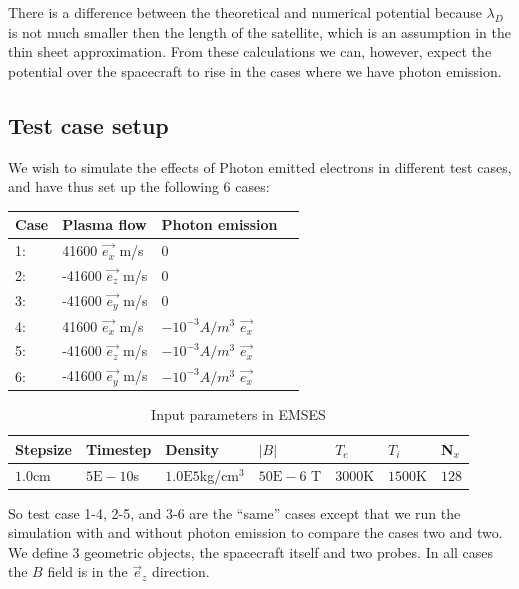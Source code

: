 There is a difference between the theoretical and numerical potential because $\lambda_D$ is not much
smaller then the length of the satellite, which is an assumption in the thin sheet approximation.
From these calculations we can, however, expect the potential over the spacecraft to rise
in the cases where we have photon emission.

\subsection{Test case setup}

We wish to simulate the effects of Photon emitted electrons in different test cases, and have thus set up the following
6 cases:
\begin{center}
    \begin{tabular}{ | l | l | l | p{5cm} |}
    \hline
    Case & Plasma flow & Photon emission  \\ \hline
     1: & 41600 $\vec{e_x}$ m/s  & 0 \\ \hline
     2: & -41600 $\vec{e_z}$ m/s & 0 \\ \hline
     3: & -41600 $\vec{e_y}$ m/s & 0 \\ \hline
     4: & 41600 $\vec{e_x}$ m/s & $-10^{-3} A/m^{3}$ $\vec{e_x}$\\ \hline
     5: & -41600 $\vec{e_z}$ m/s & $-10^{-3} A/m^{3}$ $\vec{e_x}$\\ \hline
     6: & -41600 $\vec{e_y}$ m/s & $-10^{-3} A/m^{3}$  $\vec{e_x}$\\
    \hline
    \end{tabular}
\end{center}

	\begin{table}[h]
		\centering
	    \begin{tabular}{ | l | l | l| l| l | l | l |}
	    \hline
		Stepsize & Timestep & Density &\(|B|\) & \(T_e\) & \(T_i\) & N\(_x\)\\
		\hline
		\(1.0\)cm & \(5\text{E}-10\)s & \(1.0\text{E}5\)kg/cm\(^3\) &  \(50\text{E}-6\) T & \(3000\)K & \(1500\)K  & \(128\)\\
	    \hline
	    \end{tabular}
		\caption{Input parameters in EMSES}
	\end{table}

So test case 1-4, 2-5, and 3-6 are the ``same'' cases except that we run the simulation with and without
photon emission to compare the cases two and two. We define 3 geometric objects, the spacecraft itself
and two probes. In all cases the $B$ field is in the $\vec e_z$ direction.

